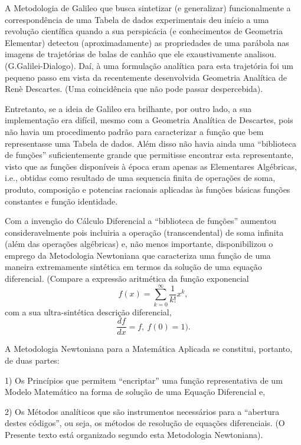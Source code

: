     A Metodologia de Galileo que busca sintetizar (e generalizar) funcionalmente a correspondência de uma Tabela de dados experimentais deu início a uma revolução científica quando a sua perspicácia (e conhecimentos de Geometria Elementar) detectou (aproximadamente) as propriedades de uma parábola nas imagens de trajetórias de balas de canhão que ele exaustivamente analisou. (G.Galilei-Dialogo). Daí, à uma formulação analítica para esta trajetória foi um pequeno passo em vista da recentemente desenvolvida Geometria Analítica de Renè Descartes. (Uma coincidência que não pode passar despercebida).

    Entretanto, se a ideia de Galileo era brilhante, por outro lado, a sua implementação era difícil, mesmo com a Geometria Analítica de Descartes, pois não havia um procedimento padrão para caracterizar a função que bem representasse uma Tabela de dados. Além disso não havia ainda uma ``biblioteca de funções'' suficientemente grande que permitisse encontrar esta representante, visto que as funções disponíveis à época eram apenas as Elementares Algébricas, i.e., obtidas como resultado de uma sequencia finita de operações de soma, produto, composição e potencias racionais aplicadas às funções básicas {funções constantes e função identidade}.

    Com a invenção do Cálculo Diferencial a ``biblioteca de funções'' aumentou consideravelmente pois incluiria a operação (transcendental) de soma infinita (além das operações algébricas) e, não menos importante, disponibilizou o emprego da Metodologia Newtoniana que caracteriza uma função de uma maneira extremamente sintética em termos da solução de uma equação diferencial. (Compare a expressão aritmética da função exponencial
    \[f(x) = \sum_{k=0}^{\infty} \dfrac{1}{k!} x^k,\]
    com a sua ultra-sintética descrição diferencial,
    \[\dfrac{df}{dx} = f,\ f(0) = 1).\]

    A Metodologia Newtoniana para a Matemática Aplicada se constitui, portanto, de duas partes:

    1) Os Princípios que permitem ``encriptar'' uma função representativa de um Modelo Matemático na forma de solução de uma Equação Diferencial e,

    2) Os Métodos analíticos que são instrumentos necessários para a ``abertura destes códigos'', ou seja, os métodos de resolução de equações diferenciais. (O Presente texto está organizado segundo esta Metodologia Newtoniana).

